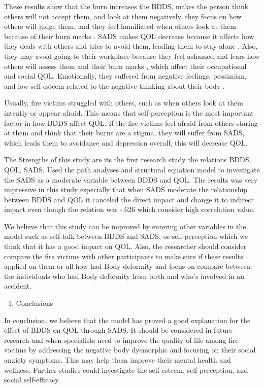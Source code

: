 \documentclass[10pt]{NSP1}
\begin{document}
These results show that the burn increases the BDDS, makes the person think others will not accept them, and look at them negatively. they focus on how others will judge them, and they feel humiliated when others look at them because of their burn marks . SADS makes QOL decrease because it affects how they deals with others and tries to avoid them, leading them to stay alone . Also, they may avoid going to their workplace because they feel ashamed and fears how others will assess them and their burn marks , which affect their occupational and social QOL. Emotionally, they suffered from negative feelings, pessimism, and low self-esteem related to the negative thinking about their body .

Usually, fire victims struggled with others, such as when others look at them intently or appear afraid. This means that self-perception is the most important factor in how BDDS affect QOL. If the fire victims feel afraid from others staring at them and think that their burns are a stigma, they will suffer from SADS, which leads them to avoidance and depression overall; this will decrease QOL.

The Strengths of this study are its the first research study the relations BDDS, QOL, SADS. Used the path analyses and structural equation model to investigate the SADS as a moderate variable between BDDS and QOL. The results was very impressive in this study especially that when SADS moderate the relationship between BDDS and QOL it canceled the direct impact and change it to indirect impact even though the relation was -.626 which consider high correlation value.

We believe that this study can be improved by entering other variables in the model such as self-talk between BDDS and SADS, or self-perception which we think that it has a good impact on QOL. Also, the researcher should consider compare the fire victims with other participants to make sure if these results applied on them or all how had Body deformity and focus on compare between the individuals who had Body deformity from birth and who’s involved in an accident.

\begin{enumerate}
  \item Conclusions
\end{enumerate}

In conclusion, we believe that the model has proved a good explanation for the effect of BDDS on QOL through SADS. It should be considered in future research and when specialists need to improve the quality of life among fire victims by addressing the negative body dysmorphic and focusing on their social anxiety symptoms. This may help them improve their mental health and wellness. Further studies could investigate the self-esteem, self-perception, and social self-efficacy.
\end{document}
